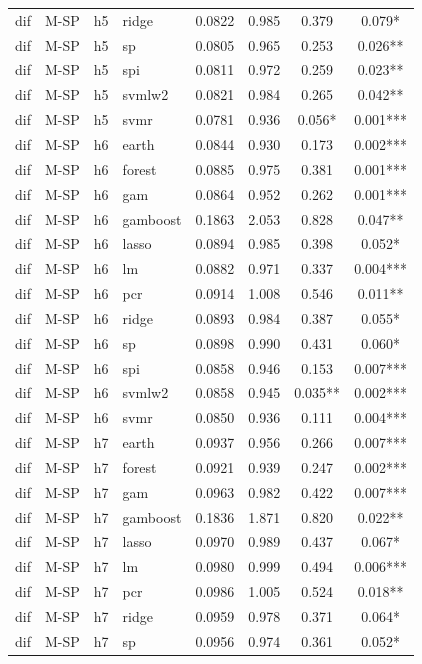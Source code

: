 \begin{ThreePartTable}
\begin{longtable}[t]{llclcccc}
dif & M-SP & h5 & ridge & 0.0822 & 0.985 & 0.379 & 0.079*\\
dif & M-SP & h5 & sp & 0.0805 & 0.965 & 0.253 & 0.026**\\
dif & M-SP & h5 & spi & 0.0811 & 0.972 & 0.259 & 0.023**\\
dif & M-SP & h5 & svmlw2 & 0.0821 & 0.984 & 0.265 & 0.042**\\
dif & M-SP & h5 & svmr & 0.0781 & 0.936 & 0.056* & 0.001***\\
\addlinespace
dif & M-SP & h6 & earth & 0.0844 & 0.930 & 0.173 & 0.002***\\
dif & M-SP & h6 & forest & 0.0885 & 0.975 & 0.381 & 0.001***\\
dif & M-SP & h6 & gam & 0.0864 & 0.952 & 0.262 & 0.001***\\
dif & M-SP & h6 & gamboost & 0.1863 & 2.053 & 0.828 & 0.047**\\
dif & M-SP & h6 & lasso & 0.0894 & 0.985 & 0.398 & 0.052*\\
dif & M-SP & h6 & lm & 0.0882 & 0.971 & 0.337 & 0.004***\\
dif & M-SP & h6 & pcr & 0.0914 & 1.008 & 0.546 & 0.011**\\
dif & M-SP & h6 & ridge & 0.0893 & 0.984 & 0.387 & 0.055*\\
dif & M-SP & h6 & sp & 0.0898 & 0.990 & 0.431 & 0.060*\\
dif & M-SP & h6 & spi & 0.0858 & 0.946 & 0.153 & 0.007***\\
dif & M-SP & h6 & svmlw2 & 0.0858 & 0.945 & 0.035** & 0.002***\\
dif & M-SP & h6 & svmr & 0.0850 & 0.936 & 0.111 & 0.004***\\
\addlinespace
dif & M-SP & h7 & earth & 0.0937 & 0.956 & 0.266 & 0.007***\\
dif & M-SP & h7 & forest & 0.0921 & 0.939 & 0.247 & 0.002***\\
dif & M-SP & h7 & gam & 0.0963 & 0.982 & 0.422 & 0.007***\\
dif & M-SP & h7 & gamboost & 0.1836 & 1.871 & 0.820 & 0.022**\\
dif & M-SP & h7 & lasso & 0.0970 & 0.989 & 0.437 & 0.067*\\
dif & M-SP & h7 & lm & 0.0980 & 0.999 & 0.494 & 0.006***\\
dif & M-SP & h7 & pcr & 0.0986 & 1.005 & 0.524 & 0.018**\\
dif & M-SP & h7 & ridge & 0.0959 & 0.978 & 0.371 & 0.064*\\
dif & M-SP & h7 & sp & 0.0956 & 0.974 & 0.361 & 0.052*\\

\end{longtable}
\end{ThreePartTable}
